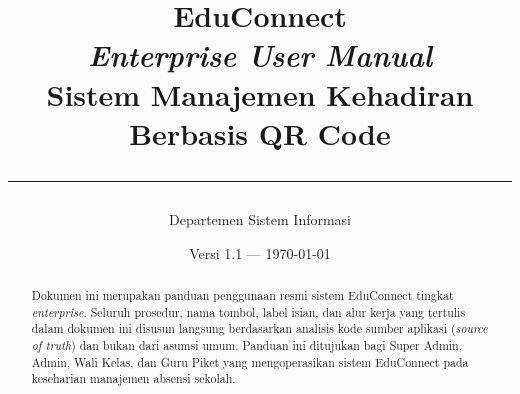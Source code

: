 \documentclass[12pt,a4paper]{book}
\title{
    \vspace{2cm}
    {\Huge\bfseries EduConnect}\\[0.5em]
    {\Large\textit{Enterprise User Manual}}\\[1.5em]
    {\normalsize Sistem Manajemen Kehadiran Berbasis QR Code}\\
    \vspace{1cm}
    \rule{\linewidth}{0.5pt}
}
\author{Departemen Sistem Informasi}
\date{Versi 1.1 --- \today}
\begin{document}
\maketitle

\begin{abstract}
Dokumen ini merupakan panduan penggunaan resmi sistem EduConnect tingkat \textit{enterprise}. Seluruh prosedur, nama tombol, label isian, dan alur kerja yang tertulis dalam dokumen ini disusun langsung berdasarkan analisis kode sumber aplikasi (\textit{source of truth}) dan bukan dari asumsi umum. Panduan ini ditujukan bagi Super Admin, Admin, Wali Kelas, dan Guru Piket yang mengoperasikan sistem EduConnect pada keseharian manajemen absensi sekolah.
\end{abstract}

\tableofcontents
\newpage










\end{document}
